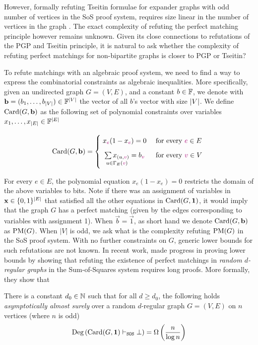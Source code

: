 \documentclass[11pt]{article}
\begin{document}
However, formally refuting Tseitin formulae for expander graphs with odd number of vertices in the SoS proof system, requires size linear in the number of vertices in the graph \cite{grigoriev2001linear}.
The exact complexity of refuting the perfect matching principle however remains unknown.
Given its close connections to refutations of the PGP and Tseitin principle, it is natural to ask whether the complexity of refuting perfect matchings for non-bipartite graphs is closer to PGP or Tseitin?
\par
To refute matchings with an algebraic proof system, we need to find a way to express the combinatorial constraints as algebraic inequalities.
More specifically, given an undirected graph $G=(V,E)$, and a constant $b\in \mathbb{F}$, we denote with $\mathbf{b} = (b_1, \dots, b_{|V|})  \in \mathbb{F}^{|V|}$ the vector of all $b$'s vector with size $|V|$.
We define $\text{Card}(G, \mathbf{b})$ as the following set of polynomial constraints over variables $x_1, \dots, x_{|E|} \in \mathbb{F}^{|E|}$

\[
        \Card{G, \vec{b}}=
        \Bigger[10]\{\begin{array}{@{}cl}
                x_{\highlight{e}}(1 - x_{\highlight{e}}) = 0 & \text{ for every $\highlight{e} \in E$}\\[3mm]
                \underset{u \in \Neighbourhood{E}{\highlight{v}}}{\sum x_{(u,\highlight{v})}}= b_{\highlight{v}} & \text{ for every $\highlight{v} \in V$} \\[3mm]
        \end{array}
\]

For every $e \in E$, the polynomial equation $x_e(1 - x_e) = 0$ restricts the domain of the above variables to bits.
Note if there was an assignment of variables in $\mathbf{x} \in \{0,1\}^{|E|}$ that satisfied all the other equations in $\text{Card}(G, \mathbf{1})$, it would imply that the graph $G$ has a perfect matching (given by the edges corresponding to variables with assignment 1).
When $\vec{b} = \vec{1}$, as short hand we denote $\text{Card}(G, \mathbf{b})$ as $\text{PM}(G)$.
When $|V|$ is odd, we ask what is the complexity refuting $\text{PM}(G)$ in the SoS proof system.
With no further constraints on $G$, generic lower bounds for such refutations are not known.
In recent work, \citet{Austrin_2022} made progress in proving lower bounds by showing that refuting the existence of perfect matchings in \emph{random $d$-regular graphs} in the Sum-of-Squares system requires long proofs.
More formally, they show that

\begin{theorem}\label{thm:prev-thm}
There is a constant $d_0 \in \mathbb{N}$ such that for all $d \geq d_0$, the following holds \emph{asymptotically almost surely} over a random $d$-regular graph $G=(V,E)$ on $n$ vertices (where $n$ is odd) \[ \text{Deg}\left(\text{Card}(G, \mathbf{1}) \vdash_{\texttt{SOS}} \bot\right) = \Omega\left(\frac{n}{\log n}\right)\]
\end{theorem}
\end{document}
